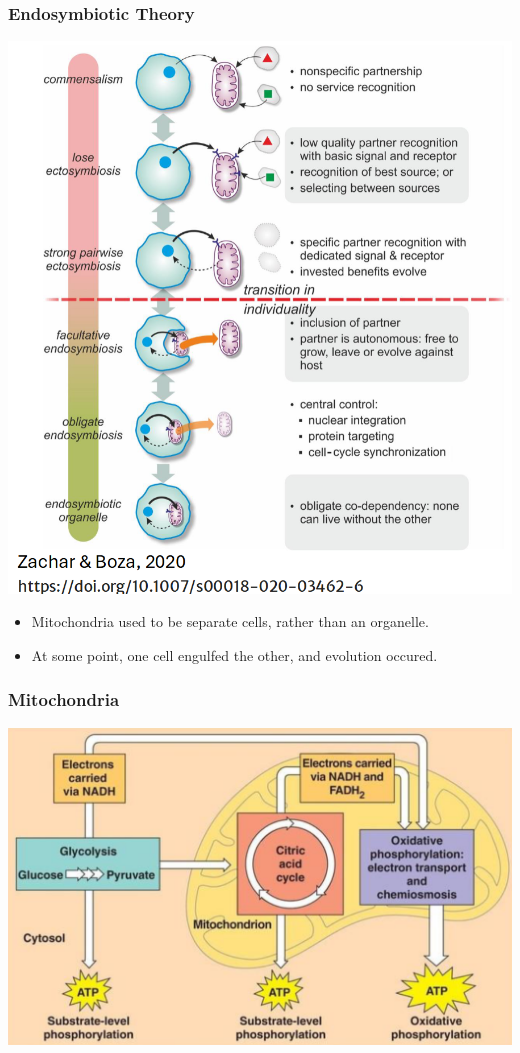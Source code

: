\documentclass[10pt]{article}
\begin{document}
\subsubsection*{Endosymbiotic Theory}
\begin{center}
    \includegraphics[scale=0.6]{L1_2.png}
\end{center}
\begin{itemize}
    \item Mitochondria used to be separate cells, rather than an organelle.
    \item At some point, one cell engulfed the other, and evolution occured.
\end{itemize}
\subsubsection*{Mitochondria}
\begin{center}
    \includegraphics*[scale=0.6]{L1_3.png}
\end{center}
\end{document}
